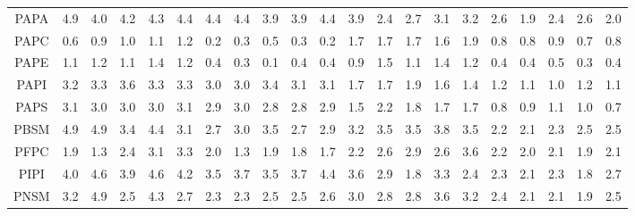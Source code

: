 \documentclass[preprint,3p,9pt,times,onecolumn]{elsarticle}
\begin{document}
\begin{table}
{\begin{tabular}{| c || cccccccccccccccccccc |}
PAPA    & 4.9        & 4.0        & 4.2        & 4.3        & 4.4        & 4.4        & 4.4        & 3.9        & 3.9        & 4.4        & 3.9        & 2.4        & 2.7        & 3.1        & 3.2        & 2.6        & 1.9        & 2.4        & 2.6        & 2.0        \\
PAPC    & 0.6        & 0.9        & 1.0        & 1.1        & 1.2        & 0.2        & 0.3        & 0.5        & 0.3        & 0.2        & 1.7        & 1.7        & 1.7        & 1.6        & 1.9        & 0.8        & 0.8        & 0.9        & 0.7        & 0.8        \\
PAPE    & 1.1        & 1.2        & 1.1        & 1.4        & 1.2        & 0.4        & 0.3        & 0.1        & 0.4        & 0.4        & 0.9        & 1.5        & 1.1        & 1.4        & 1.2        & 0.4        & 0.4        & 0.5        & 0.3        & 0.4        \\
PAPI    & 3.2        & 3.3        & 3.6        & 3.3        & 3.3        & 3.0        & 3.0        & 3.4        & 3.1        & 3.1        & 1.7        & 1.7        & 1.9        & 1.6        & 1.4        & 1.2        & 1.1        & 1.0        & 1.2        & 1.1        \\
PAPS    & 3.1        & 3.0        & 3.0        & 3.0        & 3.1        & 2.9        & 3.0        & 2.8        & 2.8        & 2.9        & 1.5        & 2.2        & 1.8        & 1.7        & 1.7        & 0.8        & 0.9        & 1.1        & 1.0        & 0.7        \\
PBSM    & 4.9        & 4.9        & 3.4        & 4.4        & 3.1        & 2.7        & 3.0        & 3.5        & 2.7        & 2.9        & 3.2        & 3.5        & 3.5        & 3.8        & 3.5        & 2.2        & 2.1        & 2.3        & 2.5        & 2.5        \\
PFPC    & 1.9        & 1.3        & 2.4        & 3.1        & 3.3        & 2.0        & 1.3        & 1.9        & 1.8        & 1.7        & 2.2        & 2.6        & 2.9        & 2.6        & 3.6        & 2.2        & 2.0        & 2.1        & 1.9        & 2.1        \\
PIPI    & 4.0        & 4.6        & 3.9        & 4.6        & 4.2        & 3.5        & 3.7        & 3.5        & 3.7        & 4.4        & 3.6        & 2.9        & 1.8        & 3.3        & 2.4        & 2.3        & 2.1        & 2.3        & 1.8        & 2.7        \\
PNSM    & 3.2        & 4.9        & 2.5        & 4.3        & 2.7        & 2.3        & 2.3        & 2.5        & 2.5        & 2.6        & 3.0        & 2.8        & 2.8        & 3.6        & 3.2        & 2.4        & 2.1        & 2.1        & 1.9        & 2.5        \\

\end{tabular}}
\end{table}
\end{document}
